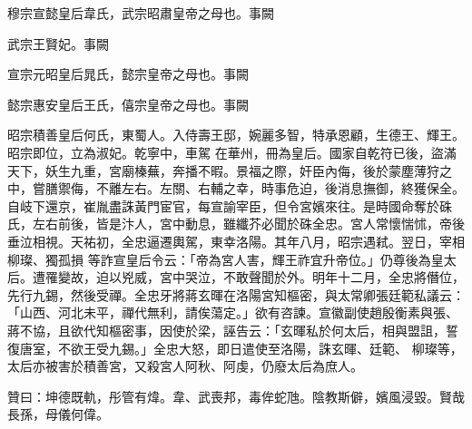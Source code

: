 \begin{pinyinscope}
 穆宗宣懿皇后韋氏，武宗昭肅皇帝之母也。事闕



 武宗王賢妃。事闕



 宣宗元昭皇后晁氏，懿宗皇帝之母也。事闕



 懿宗惠安皇后王氏，僖宗皇帝之母也。事闕



 昭宗積善皇后何氏，東蜀人。入侍壽王邸，婉麗多智，特承恩顧，生德王、輝王。昭宗即位，立為淑妃。乾寧中，車駕
 在華州，冊為皇后。國家自乾符已後，盜滿天下，妖生九重，宮廟榛蕪，奔播不暇。景福之際，奸臣內侮，後於蒙塵薄狩之中，嘗膳禦侮，不離左右。左關、右輔之幸，時事危迫，後消息撫御，終獲保全。自岐下還京，崔胤盡誅黃門宦官，每宣諭宰臣，但令宮嬪來往。是時國命奪於硃氏，左右前後，皆是汴人，宮中動息，雖纖芥必聞於硃全忠。宮人常懷惴怵，帝後垂泣相視。天祐初，全忠逼遷輿駕，東幸洛陽。其年八月，昭宗遇弒。翌日，宰相柳璨、獨孤損
 等詐宣皇后令云：「帝為宮人害，輝王祚宜升帝位。」仍尊後為皇太后。遭罹變故，迫以兇威，宮中哭泣，不敢聲聞於外。明年十二月，全忠將僭位，先行九錫，然後受禪。全忠牙將蔣玄暉在洛陽宮知樞密，與太常卿張廷範私議云：「山西、河北未平，禪代無利，請俟蕩定。」欲有咨諫。宣徽副使趙殷衡素與張、蔣不協，且欲代知樞密事，因使於梁，誣告云：「玄暉私於何太后，相與盟詛，誓復唐室，不欲王受九錫。」全忠大怒，即日遣使至洛陽，誅玄暉、廷範、
 柳璨等，太后亦被害於積善宮，又殺宮人阿秋、阿虔，仍廢太后為庶人。



 贊曰：坤德既軌，彤管有煒。韋、武喪邦，毒侔蛇虺。陰教斯僻，嬪風浸毀。賢哉長孫，母儀何偉。



\end{pinyinscope}